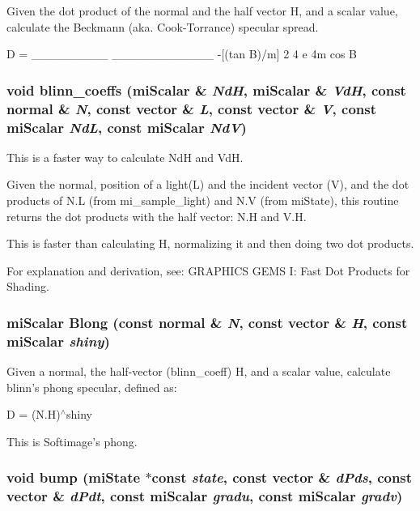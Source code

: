 Given the dot product of the normal and the half vector H, and a scalar value, calculate the Beckmann (aka. Cook-Torrance) specular spread.

D = \_\-\_\-\_\-\_\-\_\-\_\-\_\-\_\-\_ \_\-\_\-\_\-\_\-\_\-\_\-\_\-\_\-\_\-\_\-\_\-\_ -[(tan B)/m] 2 4 e 4m cos B 
\subsubsection{\setlength{\rightskip}{0pt plus 5cm}void blinn\_\-coeffs (mi\-Scalar \& {\em Nd\-H}, mi\-Scalar \& {\em Vd\-H}, const normal \& {\em N}, const vector \& {\em L}, const vector \& {\em V}, const mi\-Scalar {\em Nd\-L}, const mi\-Scalar {\em Nd\-V})\hspace{0.3cm}{\tt  [inline]}}\label{namespacemr_a71}


This is a faster way to calculate Nd\-H and Vd\-H.

Given the normal, position of a light(L) and the incident vector (V), and the dot products of N.L (from mi\_\-sample\_\-light) and N.V (from mi\-State), this routine returns the dot products with the half vector: N.H and V.H.

This is faster than calculating H, normalizing it and then doing two dot products.

For explanation and derivation, see: GRAPHICS GEMS I: Fast Dot Products for Shading. 
\subsubsection{\setlength{\rightskip}{0pt plus 5cm}mi\-Scalar Blong (const normal \& {\em N}, const vector \& {\em H}, const mi\-Scalar {\em shiny})\hspace{0.3cm}{\tt  [inline]}}\label{namespacemr_a78}


Given a normal, the half-vector (blinn\_\-coeff) H, and a scalar value, calculate blinn's phong specular, defined as:

D = (N.H)$^\wedge$shiny

This is Softimage's phong. 
\subsubsection{\setlength{\rightskip}{0pt plus 5cm}void bump (mi\-State $\ast$const {\em state}, const vector \& {\em d\-Pds}, const vector \& {\em d\-Pdt}, const mi\-Scalar {\em gradu}, const mi\-Scalar {\em gradv})\hspace{0.3cm}{\tt  [inline]}}\label{namespacemr_a19}


